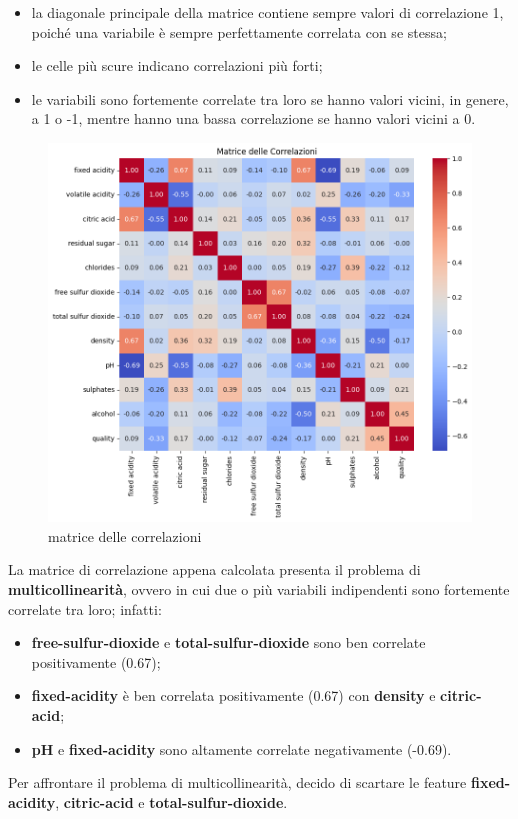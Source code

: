 \documentclass{article}
\begin{document}
\begin{titlepage}
        \begin{itemize}
            \item la diagonale principale della matrice contiene sempre valori di correlazione 1, poiché una variabile è sempre perfettamente correlata con se stessa;
            \item le celle più scure indicano correlazioni più forti;
            \item le variabili sono fortemente correlate tra loro se hanno valori vicini, in genere, a 1 o -1, mentre hanno una bassa correlazione se hanno valori vicini a 0.
        \end{itemize}

        \begin{figure}[ht]
            \centering
            \includegraphics[width=0.6\linewidth]{correlation-matrix.png}
            \caption{  matrice delle correlazioni}
            \label{fig:enter-label}
        \end{figure}

        \newpage
        La matrice di correlazione appena calcolata presenta il problema di \textbf{multicollinearità}, ovvero in cui due o più variabili indipendenti sono fortemente correlate tra loro; infatti:
        \begin{itemize}
            \item \textbf{free-sulfur-dioxide} e \textbf{total-sulfur-dioxide} sono ben correlate positivamente (0.67);
            \item \textbf{fixed-acidity} è ben correlata positivamente (0.67) con \textbf{density} e \textbf{citric-acid};
            \item\textbf{pH} e \textbf{fixed-acidity} sono altamente correlate negativamente (-0.69).
        \end{itemize}
        Per affrontare il problema di multicollinearità, decido di scartare le feature \textbf{fixed-acidity}, \textbf{citric-acid} e \textbf{total-sulfur-dioxide}.


\end{titlepage}
\end{document}
